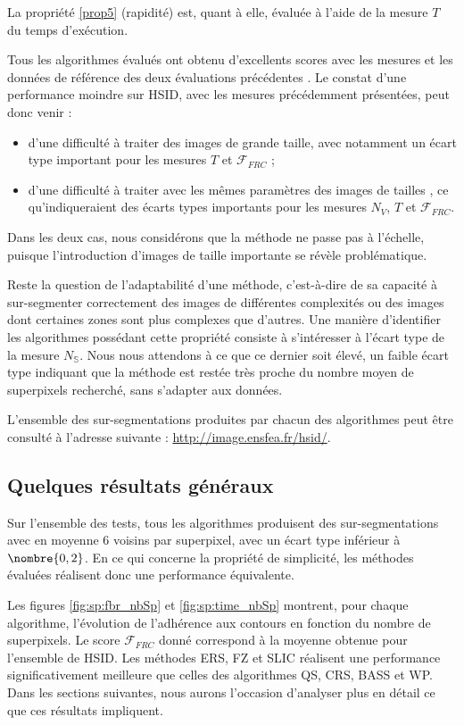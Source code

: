 La propriété \ref{prop5} (rapidité) est, quant à elle, évaluée à l'aide de la mesure $T$ du temps d’exécution.

Tous les algorithmes évalués ont obtenu d'excellents scores avec les mesures et les données de référence des deux évaluations précédentes \cite{achanta2012slic,stutz2015superpixel}. Le constat d'une performance moindre sur HSID, avec les mesures précédemment présentées, peut donc venir :
\begin{itemize}
\item d'une difficulté à traiter des images de grande taille, avec notamment un écart type important pour les mesures $T$ et $\mathcal{F}_{FRC}$ ;
\item d'une difficulté à traiter avec les mêmes paramètres des images de tailles , ce qu'indiqueraient des écarts types importants pour les mesures $N_{V}$, $T$ et $\mathcal{F}_{FRC}$.
\end{itemize}

Dans les deux cas, nous considérons que la méthode ne passe pas à l'échelle, puisque l'introduction d'images de taille importante se révèle problématique. 

Reste la question de l'adaptabilité d'une méthode, c'est-à-dire de sa capacité à sur-segmenter correctement des images de différentes complexités ou des images dont certaines zones sont plus complexes que d'autres. Une manière d'identifier les algorithmes possédant cette propriété consiste à s'intéresser à l'écart type de la mesure $N_{\mathbb{S}}$. Nous nous attendons à ce que ce dernier soit élevé, un faible écart type indiquant que la méthode est restée très proche du nombre moyen de superpixels recherché, sans s'adapter aux données.

L'ensemble des sur-segmentations produites par chacun des algorithmes peut être consulté à l'adresse suivante : \url{http://image.ensfea.fr/hsid/}.

\subsection{Quelques résultats généraux}

Sur l'ensemble des tests, tous les algorithmes produisent des sur-segmentations avec en moyenne $6$ voisins par superpixel, avec un écart type inférieur à $\nombre{0,2}$. En ce qui concerne la propriété de simplicité, les méthodes évaluées réalisent donc une performance équivalente.

Les figures \ref{fig:sp:fbr_nbSp} et \ref{fig:sp:time_nbSp} montrent, pour chaque algorithme, l’évolution de l'adhérence aux contours en fonction du nombre de superpixels.  Le score $\mathcal{F}_{FRC}$ donné correspond à la moyenne obtenue pour l'ensemble de HSID. Les méthodes ERS, FZ et SLIC réalisent une performance significativement meilleure que celles des algorithmes QS, CRS, BASS et WP. Dans les sections suivantes, nous aurons l'occasion d'analyser plus en détail ce que ces résultats impliquent. 


